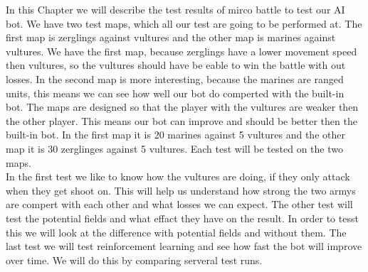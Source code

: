 In this Chapter we will describe the test results of mirco battle to test our AI bot. We have two test maps, which all our test are going to be performed at.
The first map is  zerglings against vultures and the other map is marines against vultures. We have the first map, because zerglings have a lower movement
speed then vultures, so the vultures should have be eable to win the battle with out losses. In the second map is more interesting, because the marines
are ranged units, this means we can see how well our bot do comperted with the built-in bot. The maps are  designed so that the player with the vultures
are weaker then the other player. This means our bot can improve and should be better then the built-in bot. In the first map it is 20 marines against 5
vultures and the other map it is 30 zerglinges against 5 vultures. Each test will be tested on the two maps. \\
 In the first test we like to know how the vultures are doing, if they only attack when they get shoot on. This will help us understand how strong the
two armys are compert with each other and what losses we can expect. The other test will test the potential fields and what effact they have on the result.
In order to tesst this we will look at the difference with potential fields and without them. The last test we will test reinforcement learning and see how
fast the bot will improve over time. We will do this by comparing serveral test runs.
